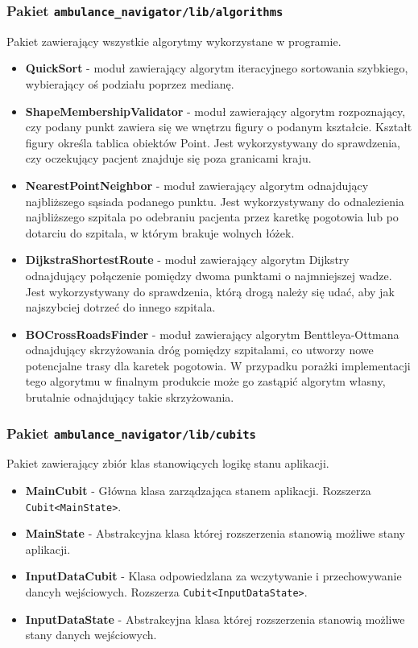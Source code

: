 \documentclass{article}
\begin{document}
\subsubsection{Pakiet \texttt{ambulance\_navigator/lib/algorithms}}
Pakiet zawierający wszystkie algorytmy wykorzystane w programie.
\begin{itemize}
\item \textbf{QuickSort} - moduł zawierający algorytm iteracyjnego sortowania szybkiego, wybierający oś podziału poprzez medianę.

\item \textbf{ShapeMembershipValidator} - moduł zawierający algorytm rozpoznający, czy podany punkt zawiera się we wnętrzu figury o podanym kształcie. Kształt figury określa tablica obiektów  Point. Jest wykorzystywany do sprawdzenia, czy oczekujący pacjent znajduje się poza granicami kraju.

\item \textbf{NearestPointNeighbor} - moduł zawierający algorytm odnajdujący najbliższego sąsiada podanego punktu. Jest wykorzystywany do odnalezienia najbliższego szpitala po odebraniu pacjenta przez karetkę pogotowia lub po dotarciu do szpitala, w którym brakuje wolnych łóżek.

\item \textbf{DijkstraShortestRoute} - moduł zawierający algorytm Dijkstry odnajdujący połączenie pomiędzy dwoma punktami o najmniejszej wadze. Jest wykorzystywany do sprawdzenia, którą drogą należy się udać, aby jak najszybciej dotrzeć do innego szpitala.

\item \textbf{BOCrossRoadsFinder} - moduł zawierający algorytm Benttleya-Ottmana odnajdujący skrzyżowania dróg pomiędzy szpitalami, co utworzy nowe potencjalne trasy dla karetek pogotowia. W przypadku porażki implementacji tego algorytmu w finalnym produkcie może go zastąpić algorytm własny, brutalnie odnajdujący takie skrzyżowania.
\end{itemize}

\subsubsection{Pakiet \texttt{ambulance\_navigator/lib/cubits}}
Pakiet zawierający zbiór klas stanowiących logikę stanu aplikacji.
\begin{itemize}
\item \textbf{MainCubit} - Główna klasa zarządzająca stanem aplikacji. Rozszerza \texttt{Cubit<MainState>}.
\item \textbf{MainState} - Abstrakcyjna klasa której rozszerzenia stanowią możliwe stany aplikacji.
\item \textbf{InputDataCubit} - Klasa odpowiedzlana za wczytywanie i przechowywanie dancyh wejściowych. Rozszerza \texttt{Cubit<InputDataState>}.
\item \textbf{InputDataState} - Abstrakcyjna klasa której rozszerzenia stanowią możliwe stany danych wejściowych.
\end{itemize}
\end{document}
